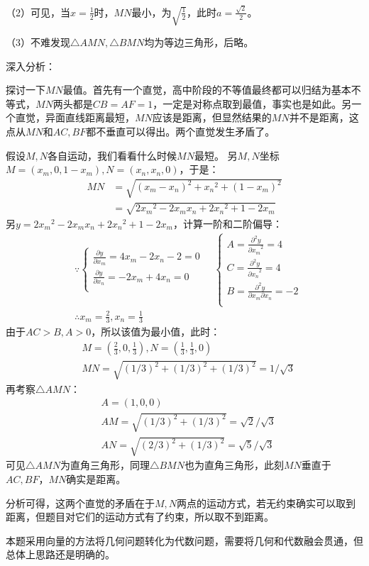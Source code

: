 （2）可见，当$x=\frac{1}{2}$时，$MN$最小，为$\sqrt{\frac{1}{2}}$，此时$a=\frac{\sqrt{2}}{2}$。

（3）不难发现$\bigtriangleup AMN,\bigtriangleup BMN$均为等边三角形，后略。

深入分析：

探讨一下$MN$最值。首先有一个直觉，高中阶段的不等值最终都可以归结为基本不等式，$MN$两头都是$CB=AF=1$，一定是对称点取到最值，事实也是如此。另一个直觉，异面直线距离最短，$MN$应该是距离，但显然结果的$MN$并不是距离，这点从$MN$和$AC,BF$都不垂直可以得出。两个直觉发生矛盾了。

假设$M,N$各自运动，我们看看什么时候$MN$最短。
另$M,N$坐标$M=\left( x_m,0,1-x_m \right) ,N=\left( x_n,x_n,0 \right) $，于是：
\begin{align*}
MN&=\sqrt{\left( x_m-x_n \right) ^2+{x_n}^2+\left( 1-x_m \right) ^2} \\
&=\sqrt{2{x_m}^2-2x_mx_n+2{x_n}^2+1-2x_m}
\end{align*}
另$y=2{x_m}^2-2x_mx_n+2{x_n}^2+1-2x_m$，计算一阶和二阶偏导：
\begin{align*}
&\because \begin{cases}
	\frac{\partial y}{\partial x_m}=4x_m-2x_n-2=0\\
	\frac{\partial y}{\partial x_n}=-2x_m+4x_n=0\\
\end{cases} \quad \begin{cases}
	A=\frac{\partial ^2y}{{\partial x_m}^2}=4\\
	C=\frac{\partial ^2y}{{\partial x_n}^2}=4\\
	B=\frac{\partial ^2y}{\partial x_m\partial x_n}=-2\\
\end{cases} \\
&\therefore x_m=\frac{2}{3},x_n=\frac{1}{3}
\end{align*}
由于$AC>B,A>0$，所以该值为最小值，此时：
\begin{align*}
&M=\left( \frac{2}{3},0,\frac{1}{3} \right) ,N=\left( \frac{1}{3},\frac{1}{3},0 \right) \\
&MN=\sqrt{\left( 1/3 \right) ^2+\left( 1/3 \right) ^2+\left( 1/3 \right) ^2}=1/\sqrt{3}
\end{align*}
再考察$\bigtriangleup AMN$：
\begin{align*}
&A=\left( 1,0,0 \right) \\
&AM=\sqrt{\left( 1/3 \right) ^2+\left( 1/3 \right) ^2}=\sqrt{2}/\sqrt{3} \\
&AN=\sqrt{\left( 2/3 \right) ^2+\left( 1/3 \right) ^2}=\sqrt{5}/\sqrt{3}
\end{align*}
可见$\bigtriangleup AMN$为直角三角形，同理$\bigtriangleup BMN$也为直角三角形，此刻$MN$垂直于$AC,BF$，$MN$确实是距离。

分析可得，这两个直觉的矛盾在于$M,N$两点的运动方式，若无约束确实可以取到距离，但题目对它们的运动方式有了约束，所以取不到距离。

\begin{tcolorbox}
本题采用向量的方法将几何问题转化为代数问题，需要将几何和代数融会贯通，但总体上思路还是明确的。
\end{tcolorbox}




